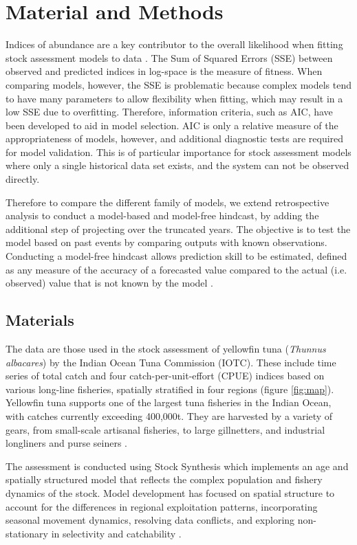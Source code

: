 \section{Material and Methods}
Indices of abundance are a key contributor to the overall likelihood when fitting stock assessment models to data \parencite{whitten2013accounting}. The Sum of Squared Errors (SSE) between observed and predicted indices in log-space is the measure of fitness. When comparing models, however, the SSE is problematic because complex models tend to have many parameters to allow flexibility when fitting, which may result in a low SSE due to overfitting. Therefore, information criteria, such as AIC, have been developed to aid in model selection. AIC is only a relative measure of the appropriateness of models, however, and additional diagnostic tests are required for model validation. This is of particular importance for stock assessment models where only a single historical data set exists, and the system can not be observed directly. 

Therefore to compare the different family of models, we extend retrospective analysis to conduct a model-based and model-free hindcast, by adding the additional step of projecting over the truncated years. The objective is to test the model based on past events by comparing outputs with known observations.  Conducting a model-free hindcast \parencite{kell2016xval} allows prediction skill to be estimated, defined as any measure of the accuracy of a forecasted value compared to the actual (i.e. observed) value that is not known by the model \parencite{glickman2000glossary}. 

\subsection{Materials}

The data are those used in the stock assessment of yellowfin tuna (\textit{Thunnus albacares}) by the Indian Ocean Tuna Commission (IOTC). These include time series of total catch and four catch-per-unit-effort (CPUE) indices based on various long-line fisheries, spatially stratified in four regions (figure \ref{fig:map}). Yellowfin tuna supports one of the largest tuna fisheries in the Indian Ocean, with catches currently exceeding 400,000t. They are harvested by a variety of gears, from small-scale artisanal fisheries, to large gillnetters, and industrial longliners and purse seiners \parencite{fiorellato2019tt}.

The assessment is conducted using Stock Synthesis \parencite[SS3,][]{methot2013stock} which implements an age and spatially structured model that reflects the complex population and fishery dynamics of the stock. Model development has focused on spatial structure to account for the differences in regional exploitation patterns, incorporating seasonal movement dynamics, resolving data conflicts, and exploring non-stationary in selectivity and catchability \parencite{urtizberea2018yft}.

